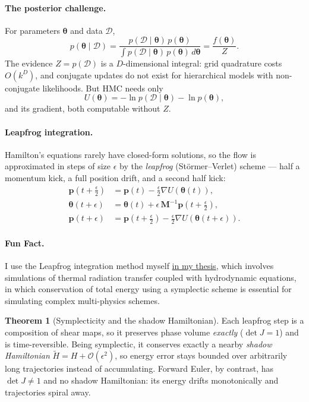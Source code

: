 \documentclass[10pt,a4paper]{article}
\theoremstyle{definition}
\newtheorem*{thm}{Theorem}
\begin{document}
\paragraph{The posterior challenge.} For parameters $\boldsymbol{\theta}$ and
data $\mathcal{D}$,
\[
  p(\boldsymbol{\theta} \mid \mathcal{D})
  = \frac{p(\mathcal{D} \mid \boldsymbol{\theta})\, p(\boldsymbol{\theta})}
         {\int p(\mathcal{D} \mid \boldsymbol{\theta})\,
                p(\boldsymbol{\theta})\, d\boldsymbol{\theta}}
  = \frac{f(\boldsymbol{\theta})}{Z}.
\]
The evidence $Z = p(\mathcal{D})$ is a $D$-dimensional integral: grid quadrature
costs $O(k^{D})$, and conjugate updates do not exist for hierarchical models
with non-conjugate likelihoods. But HMC needs only
\[
  U(\boldsymbol{\theta}) = -\ln p(\mathcal{D} \mid \boldsymbol{\theta})
                           - \ln p(\boldsymbol{\theta}),
\]
and its gradient, both computable without $Z$.

\paragraph{Leapfrog integration.} Hamilton's equations rarely have closed-form
solutions, so the flow is approximated in steps of size $\epsilon$ by the
\emph{leapfrog} (Störmer--Verlet) scheme --- half a momentum kick, a full
position drift, and a second half kick:
\begin{align*}
  \mathbf{p}(t + \tfrac{\epsilon}{2})
    &= \mathbf{p}(t) - \tfrac{\epsilon}{2}\nabla U(\boldsymbol{\theta}(t)),\\
  \boldsymbol{\theta}(t + \epsilon)
    &= \boldsymbol{\theta}(t)
       + \epsilon\, \mathbf{M}^{-1}\mathbf{p}(t + \tfrac{\epsilon}{2}),\\
  \mathbf{p}(t + \epsilon)
    &= \mathbf{p}(t + \tfrac{\epsilon}{2})
       - \tfrac{\epsilon}{2}\nabla U(\boldsymbol{\theta}(t + \epsilon)).
\end{align*}
\paragraph{Fun Fact.} I use the Leapfrog integration method myself \underline{in my thesis}, which involves simulations of thermal radiation transfer coupled with hydrodynamic equations, in which conservation of total energy using a symplectic scheme is essential for simulating complex multi-physics schemes.
\begin{thm}[Symplecticity and the shadow Hamiltonian]
Each leapfrog step is a composition of shear maps, so it preserves phase volume
\emph{exactly} ($\det J = 1$) and is time-reversible. Being symplectic, it
conserves exactly a nearby \emph{shadow Hamiltonian}
$\tilde{H} = H + \mathcal{O}(\epsilon^{2})$, so energy error stays bounded over
arbitrarily long trajectories instead of accumulating. Forward Euler, by
contrast, has $\det J \neq 1$ and no shadow Hamiltonian: its energy drifts
monotonically and trajectories spiral away.
\end{thm}
\end{document}
